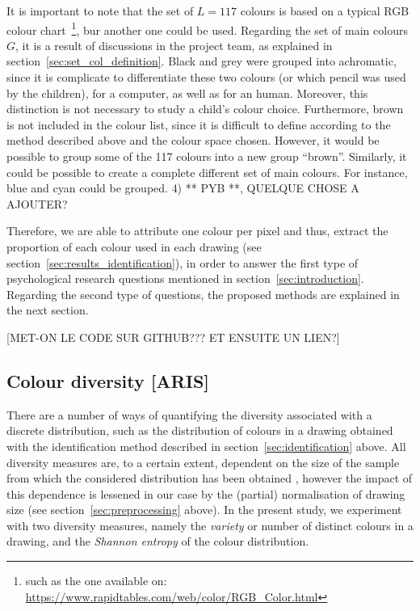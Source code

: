 \documentclass[11pt,a4paper]{article}
\begin{document}
It is important to note that the set of $L=117$ colours is based on a typical RGB colour chart~\footnote{such as the one available on: \url{https://www.rapidtables.com/web/color/RGB_Color.html}}, bur another one could be used. Regarding the set of main colours $G$, it is a result of discussions in the project team, as explained in section~\ref{sec:set_col_definition}. Black and grey were grouped into achromatic, since it is complicate to differentiate these two colours (or which pencil was used by the children), for a computer, as well as for an human. Moreover, this distinction is not necessary to study a child's colour choice. Furthermore, brown is not included in the colour list, since it is difficult to define according to the method described above and the colour space chosen. However, it would be possible to group some of the 117 colours into a new group ``brown''. Similarly, it could be possible to create a complete different set of main colours. For instance, blue and cyan could be grouped.
{\color{red} 4) ** PYB **, QUELQUE CHOSE A AJOUTER?}

Therefore, we are able to attribute one colour per pixel and thus, extract the proportion of
each colour used in each drawing (see section~\ref{sec:results_identification}), in order to answer the first type of psychological research questions mentioned in section~\ref{sec:introduction}. 
Regarding the second type of questions, the proposed methods are explained in the next section.



{\color{red}[MET-ON LE CODE SUR GITHUB??? ET ENSUITE UN LIEN?]}


\subsection{Colour diversity [ARIS]}
\label{sec:diversity}


There are a number of ways of quantifying the diversity associated with a discrete distribution, such as the distribution of colours in a drawing obtained with the identification method described in section~\ref{sec:identification} above. All diversity measures are, to a certain extent, dependent on the size of the sample from which the considered distribution has been obtained \cite[see e.g.][]{TweedieBaayen1998}, however the impact of this dependence is lessened in our case by the (partial) normalisation of drawing size (see section~\ref{sec:preprocessing} above). In the present study, we experiment with two diversity measures, namely the {\em variety} or number of distinct colours in a drawing, and the {\em Shannon entropy} of the colour distribution.
\end{document}
